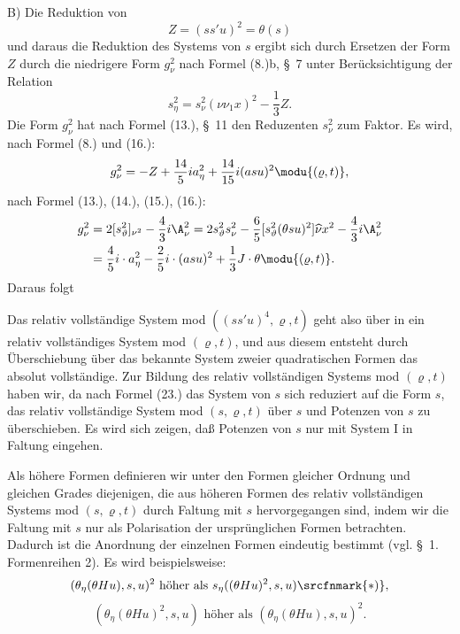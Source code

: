 B) Die Reduktion von
\[
Z=(ss'u)^2=\theta(s)
\]
und daraus die Reduktion des Systems von $s$ ergibt sich durch Ersetzen der Form $Z$ durch die niedrigere Form $g_\nu^2$ nach Formel (8.)b, \S\ 7 unter Berücksichtigung der Relation
\[
 s_\eta^2=s_\nu^2(\nu\nu_1x)^2-\frac13Z.
\]
Die Form $g_\nu^2$ hat nach Formel (13.), \S\ 11 den Reduzenten $s_\nu^2$ zum Faktor. Es wird, nach Formel (8.) und (16.):
\[
 g_\nu^2=-Z+\frac{14}{5}ia_\eta^2+\frac{14}{15}i(asu)^2
 \modu{(\varrho,t)},
\]
nach Formel (13.), (14.), (15.), (16.):
\[
\begin{aligned}
g_\nu^2&=2[s_\vartheta^2]_{\nu^2}-\frac43 i\A_\nu^2
      =2s_\vartheta^2s_\nu^2-\frac65[s_\vartheta^2(\theta su)^2]\widehat{\nu}x^2
        -\frac43i\A_\nu^2\\
&=\frac45i\cdot a_\eta^2-\frac25i\cdot(asu)^2+\frac13J\cdot\theta
\modu{(\varrho,t)}.
\end{aligned}
\]
Daraus folgt

Das relativ vollständige System mod $((ss'u)^4,\varrho,t)$ geht also über in ein relativ vollständiges System mod $(\varrho,t)$, und aus diesem entsteht durch Überschiebung über das bekannte System zweier quadratischen Formen das absolut vollständige. Zur Bildung des relativ vollständigen Systems mod $(\varrho,t)$ haben wir, da nach Formel (23.) das System von $s$ sich reduziert auf die Form $s$, das relativ vollständige System mod $(s,\varrho,t)$ über $s$ und Potenzen von $s$ zu überschieben. Es wird sich zeigen, daß Potenzen von $s$ nur mit System I in Faltung eingehen.

Als \glqq{}höhere Formen\grqq{} definieren wir unter den Formen gleicher Ordnung und gleichen Grades diejenigen, die aus höheren Formen des relativ vollständigen Systems mod $(s,\varrho,t)$ durch Faltung mit $s$ hervorgegangen sind, indem wir die Faltung mit $s$ nur als Polarisation der ursprünglichen Formen betrachten. Dadurch ist die Anordnung der einzelnen Formen eindeutig bestimmt (vgl. \S\ 1. Formenreihen 2). Es wird beispielsweise:
\[
(\theta_\eta(\theta Hu),s,u)^2\text{ höher als }s_\eta((\theta Hu)^2,s,u)\srcfnmark{*)},
\]
\[
(\theta_\eta(\theta Hu)^2,s,u)\text{ höher als }(\theta_\eta(\theta Hu),s,u)^2.
\]

